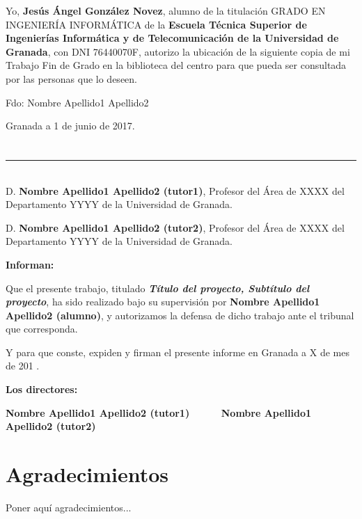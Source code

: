 Yo, \textbf{Jesús Ángel González Novez}, alumno de la titulación GRADO EN INGENIERÍA INFORMÁTICA de la \textbf{Escuela Técnica Superior
de Ingenierías Informática y de Telecomunicación de la Universidad de Granada}, con DNI 76440070F, autorizo la
ubicación de la siguiente copia de mi Trabajo Fin de Grado en la biblioteca del centro para que pueda ser
consultada por las personas que lo deseen.

\vspace{6cm}

\noindent Fdo: Nombre Apellido1 Apellido2

\vspace{2cm}

\begin{flushright}
Granada a 1 de junio de 2017.
\end{flushright}


\chapter*{}
\thispagestyle{empty}

\noindent\rule[-1ex]{\textwidth}{2pt}\\[4.5ex]

D. \textbf{Nombre Apellido1 Apellido2 (tutor1)}, Profesor del Área de XXXX del Departamento YYYY de la Universidad de Granada.

\vspace{0.5cm}

D. \textbf{Nombre Apellido1 Apellido2 (tutor2)}, Profesor del Área de XXXX del Departamento YYYY de la Universidad de Granada.


\vspace{0.5cm}

\textbf{Informan:}

\vspace{0.5cm}

Que el presente trabajo, titulado \textit{\textbf{Título del proyecto, Subtítulo del proyecto}},
ha sido realizado bajo su supervisión por \textbf{Nombre Apellido1 Apellido2 (alumno)}, y autorizamos la defensa de dicho trabajo ante el tribunal
que corresponda.

\vspace{0.5cm}

Y para que conste, expiden y firman el presente informe en Granada a X de mes de 201 .

\vspace{1cm}

\textbf{Los directores:}

\vspace{5cm}

\noindent \textbf{Nombre Apellido1 Apellido2 (tutor1) \ \ \ \ \ Nombre Apellido1 Apellido2 (tutor2)}

\chapter*{Agradecimientos}
\thispagestyle{empty}

       \vspace{1cm}


Poner aquí agradecimientos...

